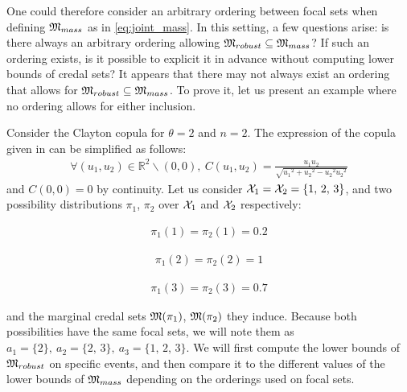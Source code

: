 One could therefore consider an arbitrary ordering between focal sets when defining $\mathfrak{M}_{mass}$ as in \eqref{eq:joint_mass}. In this setting, a few questions arise: is there always an arbitrary ordering allowing $\mathfrak{M}_{robust}\subseteq\mathfrak{M}_{mass}$? If such an ordering exists, is it possible to explicit it in advance without computing lower bounds of credal sets? It appears that there may not always exist an ordering that allows for $\mathfrak{M}_{robust}\subseteq\mathfrak{M}_{mass}$. To prove it, let us present an example where no ordering allows for either inclusion.
\begin{example}\label{ex:various_orders}
Consider the Clayton copula for $\theta=2$ and $n=2$. The expression of the copula given in  can be simplified as follows:
\begin{eqnarray*}
    \forall (u_1,u_2)\in\mathbb{R}^2\backslash(0,0), ~C(u_1,u_2)=\frac{u_1u_2}{\sqrt{{u_1}^2+{u_2}^2-{u_2}^2{u_2}^2}}
\end{eqnarray*}
and $C(0,0)=0$ by continuity. Let us consider $\mathcal{X}_1=\mathcal{X}_2=\{1,\, 2,\, 3\}$, and two possibility distributions $\pi_1$, $\pi_2$ over $\mathcal{X}_1$ and $\mathcal{X}_2$ respectively:\newline\medskip
\begin{minipage}{0.33\textwidth}
    \begin{align*}
        \pi_1(1)=\pi_2(1)=0.2
    \end{align*}
\end{minipage}\hfill
\begin{minipage}{0.33\textwidth}
    \begin{align*}
        \pi_1(2)=\pi_2(2)=1
    \end{align*}
\end{minipage}\hfill
\begin{minipage}{0.33\textwidth}
    \begin{align*}
         \pi_1(3)=\pi_2(3)=0.7
    \end{align*}
\end{minipage}\bigskip\newline
and the marginal credal sets $\mathfrak{M}(\pi_1)$, $\mathfrak{M}(\pi_2)$ they induce. Because both possibilities have the same focal sets, we will note them as $a_1=\{2\},~a_2=\{2,\, 3\},~a_3=\{1,\,2,\,3\}$. We will first compute the lower bounds of $\mathfrak{M}_{robust}$ on specific events, and then compare it to the different values of the lower bounds of $\mathfrak{M}_{mass}$ depending on the orderings used on focal sets.


\end{example}

